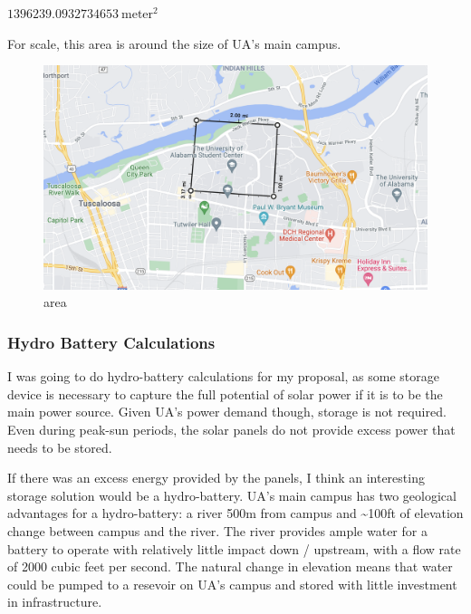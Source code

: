 \documentclass[11pt]{article}
\newcommand{\prompt}[4]{
        \ttfamily\llap{{\color{#2}[#3]:\hspace{3pt}#4}}\vspace{-\baselineskip}
    }
\begin{document}
            
\prompt{Out}{outcolor}{37}{}
    
    $1396239.0932734653\ \mathrm{meter}^{2}$

    

    For scale, this area is around the size of UA's main campus.

\begin{figure}
\centering
\includegraphics{area.png}
\caption{area}
\end{figure}

    \hypertarget{hydro-battery-calculations}{%
\subsubsection{Hydro Battery
Calculations}\label{hydro-battery-calculations}}

I was going to do hydro-battery calculations for my proposal, as some
storage device is necessary to capture the full potential of solar power
if it is to be the main power source. Given UA's power demand though,
storage is not required. Even during peak-sun periods, the solar panels
do not provide excess power that needs to be stored.

If there was an excess energy provided by the panels, I think an
interesting storage solution would be a hydro-battery. UA's main campus
has two geological advantages for a hydro-battery: a river 500m from
campus and \textasciitilde100ft of elevation change between campus and
the river. The river provides ample water for a battery to operate with
relatively little impact down / upstream, with a flow rate of 2000 cubic
feet per second. The natural change in elevation means that water could
be pumped to a resevoir on UA's campus and stored with little investment
in infrastructure.
\end{document}

